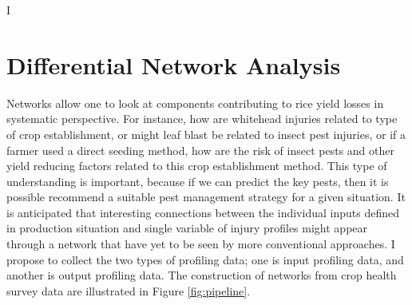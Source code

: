 I 






\section*{Differential Network Analysis}  %




Networks allow one to look at components contributing to rice yield losses in systematic perspective. For instance, how are whitehead injuries related to type of crop establishment, or might leaf blast be related to insect pest injuries, or if a farmer used a direct seeding method, how are the risk of insect pests and other yield reducing factors related to this crop establishment method. This type of understanding is important, because if we can predict the key pests, then it is possible recommend a suitable pest management strategy for a given situation. It is anticipated that interesting connections between the individual inputs defined in production situation and single variable of injury profiles might appear through a network that have yet to be seen by more conventional approaches. I propose to collect the two types of profiling data; one is input profiling data, and another is output profiling data.  The construction of networks from crop health survey data are illustrated in Figure \ref{fig:pipeline}.

 
